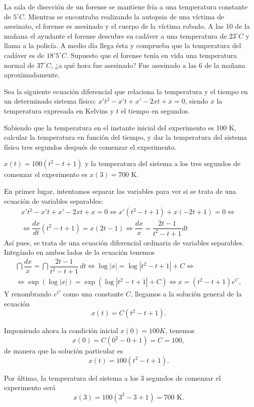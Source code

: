 {La sala de disección de un forense se mantiene fría a una temperatura constante de $5^\circ C$. Mientras se encontraba
realizando la autopsia de una víctima de asesinato, el forense es asesinado y el cuerpo de la víctima robado. A las 10
de la mañana el ayudante el forense descubre su cadáver a una temperatura de $23^\circ C$ y llama a la policía. A medio
día llega ésta y comprueba que la temperatura del cadáver es de $18'5^\circ C$. Supuesto que el forense tenía en vida
una temperatura normal de $37^\circ C$, ¿a qué hora fue asesinado?}
{Fue asesinado a las 6 de la mañana aproximadamente.
}
{}



{Sea la siguiente ecuación diferencial que relaciona la temperatura y el tiempo en un determinado sistema físico:
$x't^2  - x't + x' - 2xt + x = 0$, siendo $x$ la temperatura expresada en Kelvins y $t$ el tiempo en segundos. 

Sabiendo que la temperatura en el instante inicial del experimento es 100 K, calcular la temperatura en función del
tiempo, y dar la temperatura del sistema físico tres segundos después de comenzar el experimento.  }
{$x(t)=100(t^2-t+1)$ y la temperatura del sistema a los tres segundos de comenzar el experimento es $x(3)=700$ K.
}
{En primer lugar, intentamos separar las variables para ver si se trata de una ecuación de variables separables:
\[\renewcommand{\arraystretch}{2}
\begin{array}{c}
x't^2  - x't + x' - 2xt + x = 0 \Leftrightarrow x'(t^2-t+1)+x(-2t+1)=0 \Leftrightarrow\\
\Leftrightarrow \dfrac{dx}{dt}(t^2-t+1)=x(2t-1) \Leftrightarrow \dfrac{dx}{x}=\dfrac{2t-1}{t^2-t+1} dt
\end{array}
\]
Así pues, se trata de una ecuación diferencial ordinaria de variables separables. Integándo en ambos lados de la
ecuación tenemos  
\[\renewcommand{\arraystretch}{2}
\begin{array}{c}
\dint \dfrac{dx}{x}=\dint \dfrac{2t-1}{t^2-t+1}\,dt \Leftrightarrow \log |x|= \log |t^2-t+1|+C \Leftrightarrow \\
\Leftrightarrow \exp(\log |x| )= \exp(\log |t^2-t+1|+C) \Leftrightarrow x=(t^2-t+1)e^C,
\end{array}
\]
Y renombrando $e^C$ como una constante $C$, llegamos a la solución general de la ecuación
\[
x(t)=C(t^2-t+1).
\]

Imponiendo ahora la condición inicial $x(0)=100 K$, tenemos
\[
x(0)=C(0^2-0+1)=C=100,
\]
de manera que la solución particular es
\[
x(t)=100(t^2-t+1).
\]

Por último, la temperatura del sistema a los 3 segundos de comenzar el experimento será
\[
x(3)=100(3^2-3+1)=700\textrm{ K}.
\]
}


